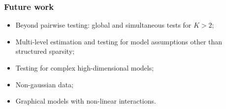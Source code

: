 \documentclass[10pt]{beamer}
\theoremstyle{definition}
\begin{document}
\begin{frame}
\frametitle{Future work}

\begin{itemize}
\item Beyond pairwise testing: global and simultaneous tests for $K > 2$;

\vspace{1em}
\item Multi-level estimation and testing for model assumptions other than structured sparsity;

\vspace{1em}
\item Testing for complex high-dimensional models;

\vspace{1em}
\item Non-gaussian data;

\vspace{1em}
\item {\colbbf Graphical models with non-linear interactions}.
\end{itemize}
\end{frame}
\end{document}
